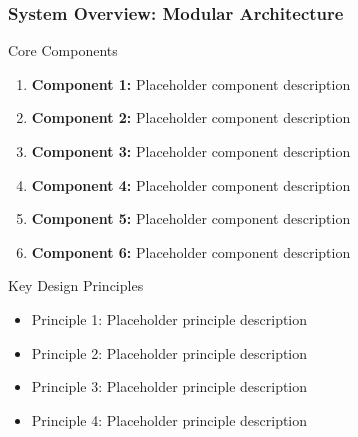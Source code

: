 \begin{frame}
\frametitle{System Overview: Modular Architecture}
\begin{block}{Core Components}
\begin{enumerate}
\item \textbf{Component 1:} Placeholder component description
\item \textbf{Component 2:} Placeholder component description
\item \textbf{Component 3:} Placeholder component description
\item \textbf{Component 4:} Placeholder component description
\item \textbf{Component 5:} Placeholder component description
\item \textbf{Component 6:} Placeholder component description
\end{enumerate}
\end{block}

\begin{block}{Key Design Principles}
\begin{itemize}
\item \textcolor{mygreen}{Principle 1:} Placeholder principle description
\item \textcolor{mygreen}{Principle 2:} Placeholder principle description
\item \textcolor{mygreen}{Principle 3:} Placeholder principle description
\item \textcolor{mygreen}{Principle 4:} Placeholder principle description
\end{itemize}
\end{block}
\end{frame}

